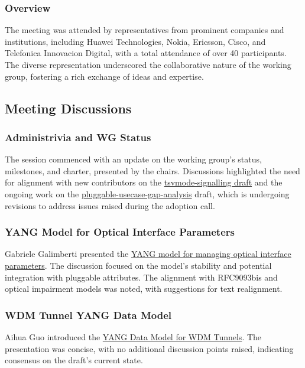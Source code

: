 \documentclass{article}
\begin{document}
\subsubsection{Overview}
The meeting was attended by representatives from prominent companies and institutions, including Huawei Technologies, Nokia, Ericsson, Cisco, and Telefonica Innovacion Digital, with a total attendance of over 40 participants. The diverse representation underscored the collaborative nature of the working group, fostering a rich exchange of ideas and expertise.

\subsection{Meeting Discussions}

\subsubsection{Administrivia and WG Status}
The session commenced with an update on the working group's status, milestones, and charter, presented by the chairs. Discussions highlighted the need for alignment with new contributors on the \href{https://datatracker.ietf.org/doc/html/draft-ietf-ccamp-tsvmode-signalling}{tsvmode-signalling draft} and the ongoing work on the \href{https://datatracker.ietf.org/doc/html/draft-ietf-ccamp-pluggable-usecase-gap-analysis}{pluggable-usecase-gap-analysis} draft, which is undergoing revisions to address issues raised during the adoption call.

\subsubsection{YANG Model for Optical Interface Parameters}
Gabriele Galimberti presented the \href{https://datatracker.ietf.org/doc/html/draft-ietf-ccamp-dwdm-if-param-yang}{YANG model for managing optical interface parameters}. The discussion focused on the model's stability and potential integration with pluggable attributes. The alignment with RFC9093bis and optical impairment models was noted, with suggestions for text realignment.

\subsubsection{WDM Tunnel YANG Data Model}
Aihua Guo introduced the \href{https://datatracker.ietf.org/doc/html/draft-ietf-ccamp-wdm-tunnel-yang}{YANG Data Model for WDM Tunnels}. The presentation was concise, with no additional discussion points raised, indicating consensus on the draft's current state.
\end{document}
